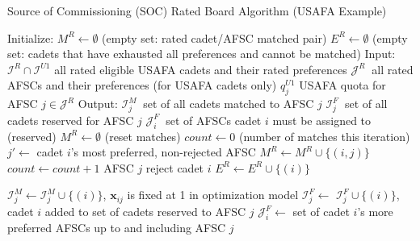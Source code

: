 \documentclass{article}
\begin{document}
\begin{algorithm}
\caption{Source of Commissioning (SOC) Rated Board Algorithm (USAFA Example)}
\begin{algorithmic}[1]

    \State Initialize:
    \State \hspace{0.42cm} $M^{R} \leftarrow \emptyset$ (empty set: rated cadet/AFSC matched pair)
    \State \hspace{0.42cm} $E^{R} \leftarrow \emptyset$ (empty set:
    cadets that have exhausted all preferences and cannot be matched)
    \State Input:
    \State \hspace{0.42cm} $\mathcal{I}^{R} \cap \mathcal{I}^{U1}$ all rated eligible USAFA cadets and their rated preferences
    \State \hspace{0.42cm} $\mathcal{J}^{R} \ $ all rated AFSCs and their preferences (for USAFA cadets only)
    \State \hspace{0.42cm} $q^{U1}_j$ USAFA quota for AFSC $j \in \mathcal{J}^R$ 
    \State Output:
    \State \hspace{0.42cm} $\mathcal{I}^{M}_j \ $ set of all cadets matched to AFSC $j$
    \State \hspace{0.42cm} $\mathcal{I}^{F}_j \ $ set of all cadets reserved for AFSC $j$
    \State \hspace{0.42cm} $\mathcal{J}^{F}_i \ $ set of AFSCs cadet $i$ must be assigned to (reserved)
        \State $M^{R} \leftarrow \emptyset$ (reset matches)
            \State $count \leftarrow 0$ (number of matches this iteration)
                \State $j' \leftarrow$ cadet $i$'s most preferred, non-rejected AFSC
                    \State $M^{R} \leftarrow M^R \cup \{ (i, j)\}$
                    \State $count \leftarrow count + 1$
                    \State AFSC $j$ reject cadet $i$
                        \State $E^R \leftarrow E^R \cup \{ (i) \}$
                    \EndIf
                \EndIf
            \EndFor
        \EndFor
    \EndWhile
    
            \State $\mathcal{I}^{M}_j \leftarrow \mathcal{I}^{M}_j \cup \{(i)\}$, $\bm{x}_{ij}$ is fixed at 1 in optimization model
        \Else
            \State $\mathcal{I}^{F}_j \leftarrow$ $\mathcal{I}^{F}_j \cup \{ (i) \}$, cadet $i$ added to set of cadets reserved to AFSC $j$
            \State $\mathcal{J}^{F}_i \leftarrow$ set of cadet $i$'s more preferred AFSCs up to and including AFSC $j$
        \EndIf
    \EndFor
\end{algorithmic}
\end{algorithm}
\end{document}
